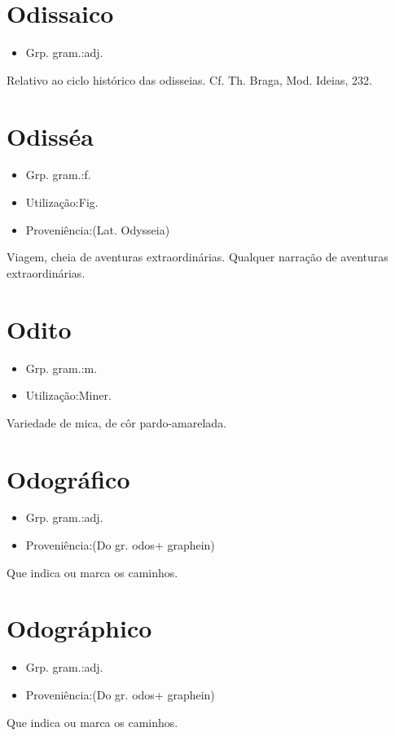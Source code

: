 \section{Odissaico}
\begin{itemize}
\item {Grp. gram.:adj.}
\end{itemize}
Relativo ao ciclo histórico das odisseias. Cf. Th. Braga, \textunderscore Mod. Ideias\textunderscore , 232.
\section{Odisséa}
\begin{itemize}
\item {Grp. gram.:f.}
\end{itemize}
\begin{itemize}
\item {Utilização:Fig.}
\end{itemize}
\begin{itemize}
\item {Proveniência:(Lat. \textunderscore Odysseia\textunderscore )}
\end{itemize}
Viagem, cheia de aventuras extraordinárias.
Qualquer narração de aventuras extraordinárias.
\section{Odito}
\begin{itemize}
\item {Grp. gram.:m.}
\end{itemize}
\begin{itemize}
\item {Utilização:Miner.}
\end{itemize}
Variedade de mica, de côr pardo-amarelada.
\section{Odográfico}
\begin{itemize}
\item {Grp. gram.:adj.}
\end{itemize}
\begin{itemize}
\item {Proveniência:(Do gr. \textunderscore odos\textunderscore  + \textunderscore graphein\textunderscore )}
\end{itemize}
Que indica ou marca os caminhos.
\section{Odográphico}
\begin{itemize}
\item {Grp. gram.:adj.}
\end{itemize}
\begin{itemize}
\item {Proveniência:(Do gr. \textunderscore odos\textunderscore  + \textunderscore graphein\textunderscore )}
\end{itemize}
Que indica ou marca os caminhos.
